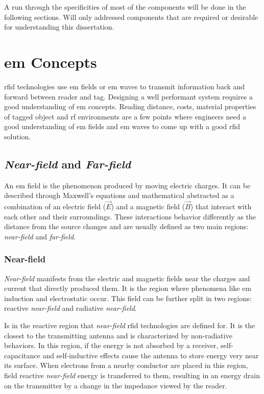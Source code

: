 A run through the specificities of most of the components will be done in the following sections. Will only addressed components that are required or desirable for understanding this dissertation.

\section{\acl{em} Concepts} \label{sec:em}


\ac{rfid} technologies use \ac{em} fields or \ac{em} waves to transmit information back and forward between reader and tag.
Designing a well performant system requires a good understanding of \ac{em} concepts.
Reading distance, costs, material properties of tagged object and \ac{rf} environments are a few points where engineers need a good understanding of \ac{em} fields and \ac{em} waves to come up with a good \ac{rfid} solution.

\subsection{\emph{Near-field} and \emph{Far-field}}

An \ac{em} field is the phenomenon produced by moving electric charges. It can be described through Maxwell's equations and mathematical abstracted as a combination of an electric field ($\vec{E}$) and a magnetic field ($\vec{B}$) that interact with each other and their surroundings.
These interactions behavior differently as the distance from the source changes and are usually defined as two main regions: \emph{near-field} and \emph{far-field}.

\subsubsection{Near-field}

\emph{Near-field} manifests from the electric and magnetic fields near the charges and current that directly produced them. It is the region where phenomena like \ac{em} induction and electrostatic occur.
This field can be further split in two regions: reactive \emph{near-field} and radiative \emph{near-field}.

Is in the reactive region that \emph{near-field} \ac{rfid} technologies are defined for. It is the closest to the transmitting antenna and is characterized by non-radiative behaviors. In this region, if the energy is not absorbed by a receiver, self-capacitance and self-inductive effects cause the antenna to store energy very near its surface. When electrons from a nearby conductor are placed in this region, field reactive \emph{near-field} energy is transferred to them, resulting in an energy drain on the transmitter by a change in the impedance viewed by the reader.

